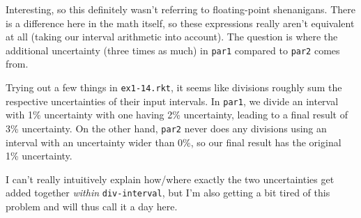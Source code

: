 \documentclass{../../sicp}
\begin{document}
Interesting, so this definitely wasn't referring to floating-point shenanigans.
There is a difference here in the math itself, so these expressions really aren't equivalent at all (taking our interval arithmetic into account).
The question is where the additional uncertainty (three times as much) in \texttt{par1} compared to \texttt{par2} comes from.

Trying out a few things in \texttt{ex1-14.rkt}, it seems like divisions roughly sum the respective uncertainties of their input intervals.
In \texttt{par1}, we divide an interval with 1\% uncertainty with one having 2\% uncertainty, leading to a final result of 3\% uncertainty.
On the other hand, \texttt{par2} never does any divisions using an interval with an uncertainty wider than 0\%, so our final result has the original 1\% uncertainty.

I can't really intuitively explain how/where exactly the two uncertainties get added together \emph{within} \texttt{div-interval}, but I'm also getting a bit tired of this problem and will thus call it a day here.
\end{document}
